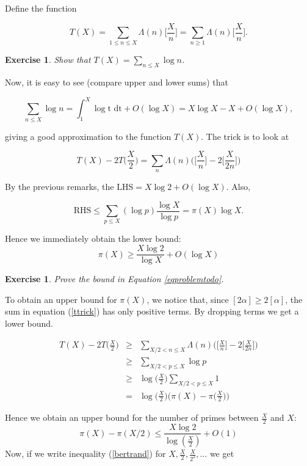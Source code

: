 \documentclass[12pt,letterpaper]{report}
\newcommand\be{\begin{equation}}
\newcommand\ee{\end{equation}}
\newcommand\bea{\begin{eqnarray}}
\newcommand\eea{\end{eqnarray}}
\newtheorem{exe}[thm]{Exercise}
\begin{document}
Define the function

\be T(X) =\sum _{1\leq n\leq X}\Lambda(n)\Bigg[\frac{X}{n}\Bigg]=
\sum _{n\geq 1}\Lambda(n)\Bigg[\frac{X}{n}\Bigg].\ee

\begin{exe} Show that
$T(X)=\sum _{n\leq X}\log n$.
\end{exe}

Now, it is easy to see (compare upper and lower sums) that

\be \sum _{n\leq X}\log n = \int_1^X \log \mbox{t dt} + O(\log X)
=X\log X-X+O(\log X), \ee

giving a good approximation to the function $T(X)$. The trick is
to look at

\begin{equation}
\label{ttrick} T(X)-2T\Big(\frac{X}{2}\Big)=\sum _n
\Lambda(n)\Bigg(\Bigg[\frac{X}{n}\Bigg]-
2\Bigg[\frac{X}{2n}\Bigg]\Bigg)
\end{equation}

By the previous remarks, the $\mbox{LHS}=X\log 2 +O(\log X)$.
Also,

\be\label{eqproblemtodo} \mbox{RHS}\leq \sum_{p\leq X}(\log
p)\frac{\log X}{\log p}= \pi (X)\log X. \ee

Hence we immediately obtain the lower bound:
\begin{equation}
\label{lowbdpi} \pi (X)\geq \frac{X\log 2}{\log X}+O(\log X)
\end{equation}

\begin{exe} Prove the bound in Equation \ref{eqproblemtodo}.
\end{exe}

To obtain an upper bound for $\pi (X)$, we notice that, since
$[2\alpha ]\geq 2[\alpha ]$, the sum in equation (\ref{ttrick})
has only positive terms. By dropping terms we get a lower bound.

\bea T(X)-2T\Big(\frac{X}{2}\Big) &\ge & \sum_{X/2< n\leq X}
\Lambda(n) \Bigg( \Bigg[\frac{X}{n} \Bigg]-2 \Bigg[\frac{X}{2n}
\Bigg] \Bigg) \nonumber\\ & \ge & \sum_{X/2< p\leq X}\log p
\nonumber\\ &
\ge & \log\Big(\frac{X}{2}\Big) \sum_{X/2< p\leq X}1 \nonumber\\
&=& \log\Big(\frac{X}{2}\Big)
\Bigg(\pi(X)-\pi\Big(\frac{X}{2}\Big)\Bigg) \eea

Hence we obtain an upper bound for the number of primes between
$\frac{X}{2}$ and $X$:
\begin{equation}
 \label{bertrand}
\pi(X)-\pi(X/2) \le \frac{X\log 2}{\log (\frac{X}{2})} +O(1)
\end{equation}
Now, if we write inequality (\ref{bertrand}) for $X, \frac{X}{2},
\frac{X}{2^2}, \dots$ we get
\end{document}
